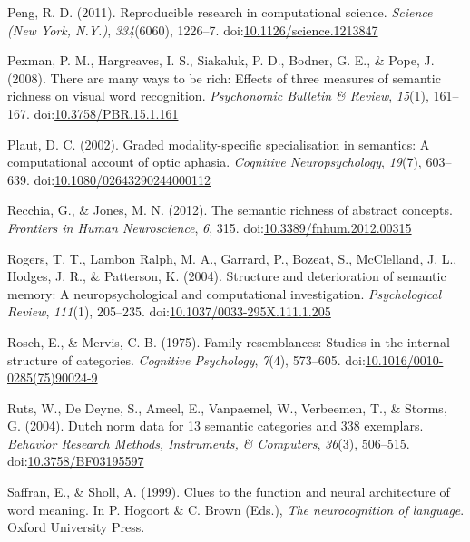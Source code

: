 \documentclass[man]{apa6}
\begin{document}
\leavevmode\hypertarget{ref-Peng2011}{}%
Peng, R. D. (2011). Reproducible research in computational science. \emph{Science (New York, N.Y.)}, \emph{334}(6060), 1226--7. doi:\href{https://doi.org/10.1126/science.1213847}{10.1126/science.1213847}

\leavevmode\hypertarget{ref-Pexman2008}{}%
Pexman, P. M., Hargreaves, I. S., Siakaluk, P. D., Bodner, G. E., \& Pope, J. (2008). There are many ways to be rich: Effects of three measures of semantic richness on visual word recognition. \emph{Psychonomic Bulletin \& Review}, \emph{15}(1), 161--167. doi:\href{https://doi.org/10.3758/PBR.15.1.161}{10.3758/PBR.15.1.161}

\leavevmode\hypertarget{ref-Plaut2002}{}%
Plaut, D. C. (2002). Graded modality-specific specialisation in semantics: A computational account of optic aphasia. \emph{Cognitive Neuropsychology}, \emph{19}(7), 603--639. doi:\href{https://doi.org/10.1080/02643290244000112}{10.1080/02643290244000112}

\leavevmode\hypertarget{ref-Recchia2012}{}%
Recchia, G., \& Jones, M. N. (2012). The semantic richness of abstract concepts. \emph{Frontiers in Human Neuroscience}, \emph{6}, 315. doi:\href{https://doi.org/10.3389/fnhum.2012.00315}{10.3389/fnhum.2012.00315}

\leavevmode\hypertarget{ref-Rogers2004}{}%
Rogers, T. T., Lambon Ralph, M. A., Garrard, P., Bozeat, S., McClelland, J. L., Hodges, J. R., \& Patterson, K. (2004). Structure and deterioration of semantic memory: A neuropsychological and computational investigation. \emph{Psychological Review}, \emph{111}(1), 205--235. doi:\href{https://doi.org/10.1037/0033-295X.111.1.205}{10.1037/0033-295X.111.1.205}

\leavevmode\hypertarget{ref-Rosch1975}{}%
Rosch, E., \& Mervis, C. B. (1975). Family resemblances: Studies in the internal structure of categories. \emph{Cognitive Psychology}, \emph{7}(4), 573--605. doi:\href{https://doi.org/10.1016/0010-0285(75)90024-9}{10.1016/0010-0285(75)90024-9}

\leavevmode\hypertarget{ref-Ruts2004}{}%
Ruts, W., De Deyne, S., Ameel, E., Vanpaemel, W., Verbeemen, T., \& Storms, G. (2004). Dutch norm data for 13 semantic categories and 338 exemplars. \emph{Behavior Research Methods, Instruments, \& Computers}, \emph{36}(3), 506--515. doi:\href{https://doi.org/10.3758/BF03195597}{10.3758/BF03195597}

\leavevmode\hypertarget{ref-Saffran1999}{}%
Saffran, E., \& Sholl, A. (1999). Clues to the function and neural architecture of word meaning. In P. Hogoort \& C. Brown (Eds.), \emph{The neurocognition of language}. Oxford University Press.
\end{document}
